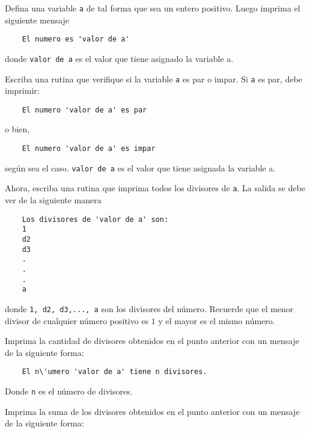 \documentclass[11pt,letterpaper]{exam}
\begin{document}
\begin{questions}
 
\question[0.5]

Defina una variable \verb'a' de tal forma que sea un entero positivo. Luego imprima el siguiente mensaje

\begin{verbatim}
	El numero es 'valor de a'
\end{verbatim}

donde \verb'valor de a' es el valor que tiene asignado la variable a.

\question[1.0]

Escriba una rutina que verifique si la variable \verb'a' es par o impar. Si \verb'a' es par, debe imprimir:

\begin{verbatim}
	El numero 'valor de a' es par
\end{verbatim}

o bien,

\begin{verbatim}
	El numero 'valor de a' es impar
\end{verbatim}

seg\'un sea el caso. \verb'valor de a' es el valor que tiene asignada la variable a.

\question[1.5]

Ahora, escriba una rutina que imprima todos los divisores de \verb'a'. La salida se debe ver de la siguiente manera

\begin{verbatim}
	Los divisores de 'valor de a' son:
	1
	d2
	d3
	.
	.
	.
	a
\end{verbatim}

donde \verb'1, d2, d3,..., a' son los divisores del n\'umero. Recuerde que el menor divisor de cualquier n\'umero positivo es $1$ y el mayor es el mismo n\'umero.

\iffalse
\question[1.0]

Imprima la cantidad de divisores obtenidos en el punto anterior con un mensaje de la siguiente forma:

\begin{verbatim}
	El n\'umero 'valor de a' tiene n divisores.
\end{verbatim}

Donde \verb'n' es el n\'umero de divisores. 

\question[1.0]

Imprima la suma de los divisores obtenidos en el punto anterior con un mensaje de la siguiente forma:


\end{questions}
\end{document}
